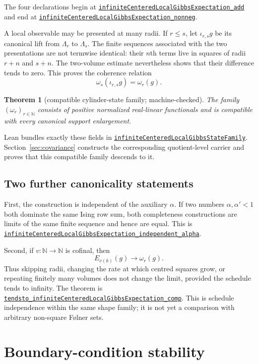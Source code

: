 \documentclass[11pt]{article}
\newtheorem{theorem}{Theorem}[section]
\theoremstyle{definition}
\newcommand{\N}{\mathbb N}
\newcommand{\sourceanchor}{f587b35001f4ae87c7fe0383662864df6bc9a1c0}
\newcommand{\leanline}[3]{%
  \href{https://github.com/lluiseriksson/THE-ERIKSSON-PROGRAMME/blob/\sourceanchor/YangMills/OS/#1.lean\#L#2}{\nolinkurl{#3}}}
\begin{document}
The four declarations begin at
\leanline{DobrushinInfiniteState}{86}{infiniteCenteredLocalGibbsExpectation_add}
and end at
\leanline{DobrushinInfiniteState}{151}{infiniteCenteredLocalGibbsExpectation_nonneg}.

A local observable may be presented at many radii.  If $r\le s$, let
$\iota_{r,s}g$ be its canonical lift from $\Lambda_r$ to $\Lambda_s$.
The finite sequences associated with the two presentations are not termwise
identical: their $n$th terms live in squares of radii $r+n$ and $s+n$.
The two-volume estimate nevertheless shows that their difference tends to
zero.  This proves the coherence relation
\[
  \omega_s(\iota_{r,s}g)=\omega_r(g).
\]

\begin{theorem}[compatible cylinder-state family; machine-checked]
\label{thm:family}
The family $(\omega_r)_{r\in\N}$ consists of positive normalized real-linear
functionals and is compatible with every canonical support enlargement.
\end{theorem}

Lean bundles exactly these fields in
\leanline{DobrushinInfiniteState}{262}{infiniteCenteredLocalGibbsStateFamily}.
Section~\ref{sec:covariance} constructs the corresponding quotient-level
carrier and proves that this compatible family descends to it.

\subsection{Two further canonicality statements}

First, the construction is independent of the auxiliary $\alpha$.  If two
numbers $\alpha,\alpha'<1$ both dominate the same Ising row sum, both
completeness constructions are limits of the same finite sequence and hence
are equal.  This is
\leanline{DobrushinInfiniteState}{183}{infiniteCenteredLocalGibbsExpectation_independent_alpha}.

Second, if $v:\N\to\N$ is cofinal, then
\[
  E_{v(k)}(g)\longrightarrow\omega_r(g).
\]
Thus skipping radii, changing the rate at which centred squares grow, or
repeating finitely many volumes does not change the limit, provided the
schedule tends to infinity.  The theorem is
\leanline{DobrushinInfiniteState}{168}{tendsto_infiniteCenteredLocalGibbsExpectation_comp}.
This is schedule independence within the same shape family; it is not yet a
comparison with arbitrary non-square F\o lner sets.

\section{Boundary-condition stability}
\label{sec:boundary}
\end{document}
